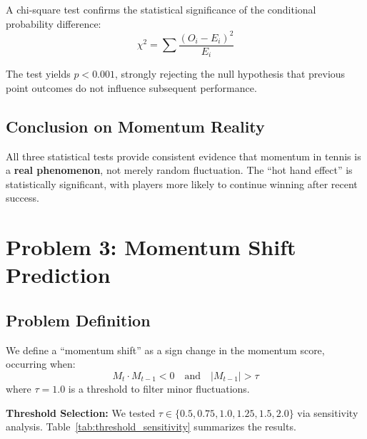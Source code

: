\documentclass{mcmthesis}
\begin{document}
A chi-square test confirms the statistical significance of the conditional probability difference:
\begin{equation}
\chi^2 = \sum \frac{(O_i - E_i)^2}{E_i}
\end{equation}

The test yields $p < 0.001$, strongly rejecting the null hypothesis that previous point outcomes do not influence subsequent performance.

\subsection{Conclusion on Momentum Reality}

All three statistical tests provide consistent evidence that momentum in tennis is a \textbf{real phenomenon}, not merely random fluctuation. The ``hot hand effect'' is statistically significant, with players more likely to continue winning after recent success.

\section{Problem 3: Momentum Shift Prediction}

\subsection{Problem Definition}

We define a ``momentum shift'' as a sign change in the momentum score, occurring when:
\begin{equation}
M_t \cdot M_{t-1} < 0 \quad \text{and} \quad |M_{t-1}| > \tau
\end{equation}
where $\tau = 1.0$ is a threshold to filter minor fluctuations.

\textbf{Threshold Selection:} We tested $\tau \in \{0.5, 0.75, 1.0, 1.25, 1.5, 2.0\}$ via sensitivity analysis. Table~\ref{tab:threshold_sensitivity} summarizes the results.

\begin{table}[H]
\centering
\caption{Threshold sensitivity analysis for momentum shift definition.}
\label{tab:threshold_sensitivity}
\end{table}
\end{document}
